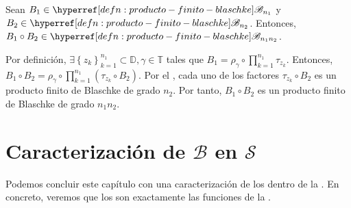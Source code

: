 \begin{teo}\label{teo:composicion-prod-finito-blaschke}
    Sean $B_1 \in \exhyperref[defn:producto-finito-blaschke]{producto-finito-blaschke}{\mathscr{B}_{n_1}}$ y $B_2 \in \exhyperref[defn:producto-finito-blaschke]{producto-finito-blaschke}{\mathscr{B}_{n_2}}$. Entonces, $B_1 \circ B_2 \in \exhyperref[defn:producto-finito-blaschke]{producto-finito-blaschke}{\mathscr{B}_{n_1 n_2}}$.
\end{teo}
\begin{dem}
    Por definición, $\exists \left\{z_k\right\}_{k=1}^{n_1} \subset \mathbb{D}, \gamma \in \mathbb{T}$ tales que $B_1 = \rho_\gamma \circ \prod_{k=1}^{n_1} \tau_{z_k}$.
    Entonces, $B_1 \circ B_2 = \rho_\gamma \circ \prod_{k=1}^{n_1} \left(\tau_{z_k} \circ B_2\right)$. Por el , cada uno de los factores $\tau_{z_k} \circ B_2$ es un producto finito de Blaschke de grado $n_2$. Por tanto, $B_1 \circ B_2$ es un producto finito de Blaschke de grado $n_1 n_2$.\hfill\qedsymbol
\end{dem}

\section{Caracterización de $\mathscr{B}$ en $\mathscr{S}$}

Podemos concluir este capítulo con una caracterización de los  dentro de la . En concreto, veremos que los  son exactamente las funciones  de la .

